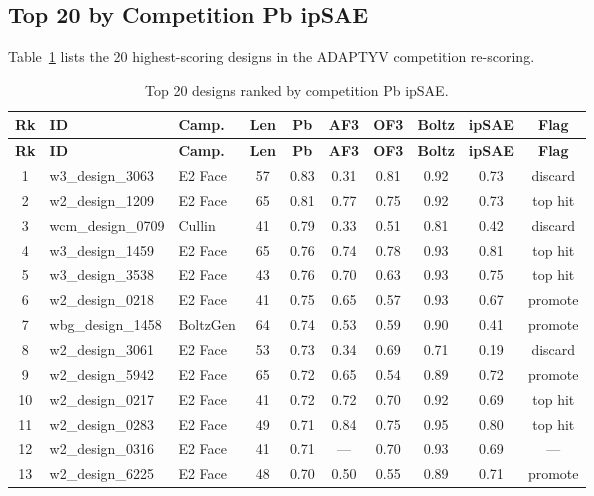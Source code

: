 \documentclass[11pt,a4paper]{article}
\begin{document}
\subsection{Top 20 by Competition Pb ipSAE}

Table~\ref{tab:top_pb} lists the 20 highest-scoring designs in the ADAPTYV competition re-scoring.

\begin{longtable}{clp{2cm}ccccccc}
\caption{Top 20 designs ranked by competition Pb ipSAE.}
\label{tab:top_pb} \\
\toprule
\textbf{Rk} & \textbf{ID} & \textbf{Camp.} & \textbf{Len} & \textbf{Pb} & \textbf{AF3} & \textbf{OF3} & \textbf{Boltz} & \textbf{ipSAE} & \textbf{Flag} \\
\midrule
\endfirsthead
\toprule
\textbf{Rk} & \textbf{ID} & \textbf{Camp.} & \textbf{Len} & \textbf{Pb} & \textbf{AF3} & \textbf{OF3} & \textbf{Boltz} & \textbf{ipSAE} & \textbf{Flag} \\
\midrule
\endhead
1  & w3\_design\_3063  & E2 Face  & 57 & 0.83 & 0.31 & 0.81 & 0.92 & 0.73 & discard \\
2  & w2\_design\_1209  & E2 Face  & 65 & 0.81 & 0.77 & 0.75 & 0.92 & 0.73 & top hit \\
3  & wcm\_design\_0709 & Cullin   & 41 & 0.79 & 0.33 & 0.51 & 0.81 & 0.42 & discard \\
4  & w3\_design\_1459  & E2 Face  & 65 & 0.76 & 0.74 & 0.78 & 0.93 & 0.81 & top hit \\
5  & w3\_design\_3538  & E2 Face  & 43 & 0.76 & 0.70 & 0.63 & 0.93 & 0.75 & top hit \\
6  & w2\_design\_0218  & E2 Face  & 41 & 0.75 & 0.65 & 0.57 & 0.93 & 0.67 & promote \\
7  & wbg\_design\_1458 & BoltzGen & 64 & 0.74 & 0.53 & 0.59 & 0.90 & 0.41 & promote \\
8  & w2\_design\_3061  & E2 Face  & 53 & 0.73 & 0.34 & 0.69 & 0.71 & 0.19 & discard \\
9  & w2\_design\_5942  & E2 Face  & 65 & 0.72 & 0.65 & 0.54 & 0.89 & 0.72 & promote \\
10 & w2\_design\_0217  & E2 Face  & 41 & 0.72 & 0.72 & 0.70 & 0.92 & 0.69 & top hit \\
11 & w2\_design\_0283  & E2 Face  & 49 & 0.71 & 0.84 & 0.75 & 0.95 & 0.80 & top hit \\
12 & w2\_design\_0316  & E2 Face  & 41 & 0.71 & ---  & 0.70 & 0.93 & 0.69 & ---     \\
13 & w2\_design\_6225  & E2 Face  & 48 & 0.70 & 0.50 & 0.55 & 0.89 & 0.71 & promote \\

\end{longtable}
\end{document}
